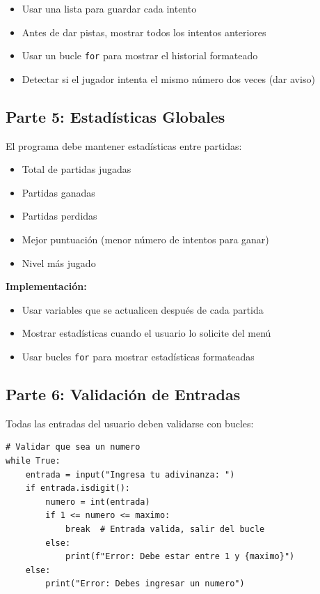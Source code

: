 \documentclass[12pt,a4paper]{article}
\begin{document}
\begin{itemize}
    \item Usar una lista para guardar cada intento
    \item Antes de dar pistas, mostrar todos los intentos anteriores
    \item Usar un bucle \texttt{for} para mostrar el historial formateado
    \item Detectar si el jugador intenta el mismo número dos veces (dar aviso)
\end{itemize}

\subsection{Parte 5: Estadísticas Globales}

El programa debe mantener estadísticas entre partidas:

\begin{itemize}
    \item Total de partidas jugadas
    \item Partidas ganadas
    \item Partidas perdidas
    \item Mejor puntuación (menor número de intentos para ganar)
    \item Nivel más jugado
\end{itemize}

\textbf{Implementación:}
\begin{itemize}
    \item Usar variables que se actualicen después de cada partida
    \item Mostrar estadísticas cuando el usuario lo solicite del menú
    \item Usar bucles \texttt{for} para mostrar estadísticas formateadas
\end{itemize}

\subsection{Parte 6: Validación de Entradas}

Todas las entradas del usuario deben validarse con bucles:

\begin{lstlisting}[caption=Ejemplo de validación con while]
# Validar que sea un numero
while True:
    entrada = input("Ingresa tu adivinanza: ")
    if entrada.isdigit():
        numero = int(entrada)
        if 1 <= numero <= maximo:
            break  # Entrada valida, salir del bucle
        else:
            print(f"Error: Debe estar entre 1 y {maximo}")
    else:
        print("Error: Debes ingresar un numero")
\end{lstlisting}
\end{document}
